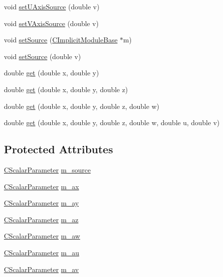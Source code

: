 \begin{DoxyCompactItemize}
void \hyperlink{classanl_1_1CImplicitTranslateDomain_a2d4e1351865ff18ed847f01bbec07b7a}{setUAxisSource} (double v)
\item 
void \hyperlink{classanl_1_1CImplicitTranslateDomain_ae16f4e19d5a442ac5f387c2324b22f3a}{setVAxisSource} (double v)
\item 
void \hyperlink{classanl_1_1CImplicitTranslateDomain_a1b35f0ba2ddca5435c0ce1da6e842174}{setSource} (\hyperlink{classanl_1_1CImplicitModuleBase}{CImplicitModuleBase} $\ast$m)
\item 
void \hyperlink{classanl_1_1CImplicitTranslateDomain_a073229df54e8a1197e57b719aa81a61a}{setSource} (double v)
\item 
double \hyperlink{classanl_1_1CImplicitTranslateDomain_a8f0d141a02e5e67245d07ee30324d13d}{get} (double x, double y)
\item 
double \hyperlink{classanl_1_1CImplicitTranslateDomain_a875f867e25e0d9c5497b68ea5ef8c358}{get} (double x, double y, double z)
\item 
double \hyperlink{classanl_1_1CImplicitTranslateDomain_a4c5022a45953ac556e169e2186bf9105}{get} (double x, double y, double z, double w)
\item 
double \hyperlink{classanl_1_1CImplicitTranslateDomain_a7d92931fb9633a1831a7303ca433546d}{get} (double x, double y, double z, double w, double u, double v)
\end{DoxyCompactItemize}
\subsection*{Protected Attributes}
\begin{DoxyCompactItemize}
\item 
\hyperlink{classanl_1_1CScalarParameter}{CScalarParameter} \hyperlink{classanl_1_1CImplicitTranslateDomain_af24a9b6669d838c88bbedce9c3952963}{m\_\-source}
\item 
\hyperlink{classanl_1_1CScalarParameter}{CScalarParameter} \hyperlink{classanl_1_1CImplicitTranslateDomain_a7a2ea3e6352fc5b7115cc190f7e194b1}{m\_\-ax}
\item 
\hyperlink{classanl_1_1CScalarParameter}{CScalarParameter} \hyperlink{classanl_1_1CImplicitTranslateDomain_a74f51a5c750b8c54d7240fa4a484345b}{m\_\-ay}
\item 
\hyperlink{classanl_1_1CScalarParameter}{CScalarParameter} \hyperlink{classanl_1_1CImplicitTranslateDomain_a9208c2a3de8c895831d0fd338538dbdc}{m\_\-az}
\item 
\hyperlink{classanl_1_1CScalarParameter}{CScalarParameter} \hyperlink{classanl_1_1CImplicitTranslateDomain_a57aff8e8396d2d70ef18d3f7c8c91f2f}{m\_\-aw}
\item 
\hyperlink{classanl_1_1CScalarParameter}{CScalarParameter} \hyperlink{classanl_1_1CImplicitTranslateDomain_ac4031ffc6d80c0c09eadbb606254bbc8}{m\_\-au}
\item 
\hyperlink{classanl_1_1CScalarParameter}{CScalarParameter} \hyperlink{classanl_1_1CImplicitTranslateDomain_aadcffe17a7017e2fe1e212de26290e00}{m\_\-av}
\end{DoxyCompactItemize}


